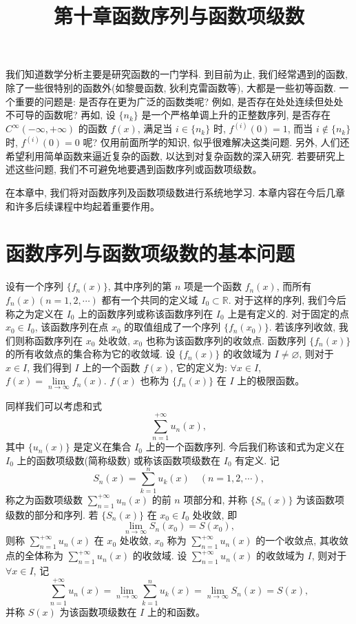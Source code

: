 \documentclass[UTF8, 12pt, fontset=fandol, oneside]{ctexart}
\title{第十章\quad 函数序列与函数项级数}
\author{}
\date{}
\begin{document}
\maketitle

我们知道数学分析主要是研究函数的一门学科. 到目前为止, 我们经常遇到的函数, 除了一些很特别的函数外(如黎曼函数, 狄利克雷函数等), 大都是一些初等函数. 一个重要的问题是: 是否存在更为广泛的函数类呢? 例如, 是否存在处处连续但处处不可导的函数呢? 再如, 设 $\{n_k\}$ 是一个严格单调上升的正整数序列, 是否存在 $C^\infty(-\infty,+\infty)$ 的函数 $f(x)$, 满足当 $i\in\{n_k\}$ 时, $f^{(i)}(0)=1$, 而当 $i\notin\{n_k\}$ 时, $f^{(i)}(0)=0$ 呢? 仅用前面所学的知识, 似乎很难解决这类问题. 另外, 人们还希望利用简单函数来逼近复杂的函数, 以达到对复杂函数的深入研究. 若要研究上述这些问题, 我们不可避免地要遇到函数序列或函数项级数。

在本章中, 我们将对函数序列及函数项级数进行系统地学习. 本章内容在今后几章和许多后续课程中均起着重要作用。

\section{函数序列与函数项级数的基本问题}

设有一个序列 $\{f_n(x)\}$, 其中序列的第 $n$ 项是一个函数 $f_n(x)$, 而所有 $f_n(x)(n=1,2,\cdots)$ 都有一个共同的定义域 $I_0\subset\mathbb R$. 对于这样的序列, 我们今后称之为定义在 $I_0$ 上的函数序列或称该函数序列在 $I_0$ 上是有定义的. 对于固定的点 $x_0\in I_0$, 该函数序列在点 $x_0$ 的取值组成了一个序列 $\{f_n(x_0)\}$. 若该序列收敛, 我们则称函数序列在 $x_0$ 处收敛, $x_0$ 也称为该函数序列的收敛点. 函数序列 $\{f_n(x)\}$ 的所有收敛点的集合称为它的收敛域. 设 $\{f_n(x)\}$ 的收敛域为 $I\ne\varnothing$, 则对于 $x\in I$, 我们得到 $I$ 上的一个函数 $f(x)$, 它的定义为: $\forall x\in I$, $f(x)=\lim\limits_{n\to\infty}f_n(x)$. $f(x)$ 也称为 $\{f_n(x)\}$ 在 $I$ 上的极限函数。

同样我们可以考虑和式
\[
  \sum_{n=1}^{+\infty}u_n(x),
\]
其中 $\{u_n(x)\}$ 是定义在集合 $I_0$ 上的一个函数序列. 今后我们称该和式为定义在 $I_0$ 上的函数项级数(简称级数) 或称该函数项级数在 $I_0$ 有定义. 记
\[
  S_n(x)=\sum_{k=1}^n u_k(x)\quad(n=1,2,\cdots),
\]
称之为函数项级数 $\sum\limits_{n=1}^{+\infty}u_n(x)$ 的前 $n$ 项部分和, 并称 $\{S_n(x)\}$ 为该函数项级数的部分和序列. 若 $\{S_n(x)\}$ 在 $x_0\in I_0$ 处收敛, 即
\[
  \lim_{n\to\infty}S_n(x_0)=S(x_0),
\]
则称 $\sum\limits_{n=1}^{+\infty}u_n(x)$ 在 $x_0$ 处收敛, $x_0$ 称为 $\sum\limits_{n=1}^{+\infty}u_n(x)$ 的一个收敛点, 其收敛点的全体称为 $\sum\limits_{n=1}^{+\infty}u_n(x)$ 的收敛域. 设 $\sum\limits_{n=1}^{+\infty}u_n(x)$ 的收敛域为 $I$, 则对于 $\forall x\in I$, 记
\[
  \sum_{n=1}^{+\infty}u_n(x)=\lim_{n\to\infty}\sum_{k=1}^n u_k(x)=\lim_{n\to\infty}S_n(x)=S(x),
\]
并称 $S(x)$ 为该函数项级数在 $I$ 上的和函数。
\end{document}
